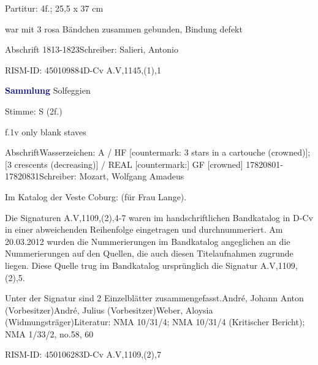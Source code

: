 \documentclass[a4paper, twocolumn, 11pt]{book}
\begin{document}
\par \begin{itshape}\end{itshape} 
\par \textcolor{darkblue}{}  Partitur: 4f.; 25,5 x 37 cm\newline \begin{small} war mit 3 rosa Bändchen zusammen gebunden, Bindung defekt\end{small} \newline Abschrift  1813-1823\newline Schreiber: Salieri, Antonio
\par RISM-ID: 450109884\newline D-Cv  A.V,1145,(1),1
\par \vspace{16pt} \textcolor{darkblue}{\textbf{Sammlung}} Solfeggien
\par \begin{itshape}\end{itshape} 
\par \textcolor{darkblue}{}  Stimme: S  (2f.)\newline \begin{small} f.1v only blank staves\end{small} \newline Abschrift\newline Wasserzeichen: A / HF [countermark: 3 stars in a cartouche (crowned)]; [3 crescents (decreasing)] / REAL [countermark:] GF [crowned]  17820801-17820831\newline Schreiber: Mozart, Wolfgang Amadeus
\par Im Katalog der Veste Coburg: {\textquotedbl}(für Frau Lange){\textquotedbl}.
\par Die Signaturen A.V,1109,(2),4-7 waren im handschriftlichen Bandkatalog in D-Cv in einer abweichenden Reihenfolge eingetragen und durchnummeriert. Am 20.03.2012 wurden die Nummerierungen im Bandkatalog angeglichen an die Nummerierungen auf den Quellen, die auch diesen Titelaufnahmen zugrunde liegen. Diese Quelle trug im Bandkatalog ursprünglich die Signatur A.V,1109,(2),5.
\par Unter der Signatur sind 2 Einzelblätter zusammengefasst.\newline André, Johann Anton  (Vorbesitzer)\newline André, Julius  (Vorbesitzer)\newline Weber, Aloysia  (Widmungsträger)\newline Literatur: NMA  10/31/4; NMA  10/31/4 (Kritischer Bericht); NMA  1/33/2, no.58, 60
\par RISM-ID: 450106283\newline D-Cv  A.V,1109,(2),7
    \clearpage  
\end{document}
